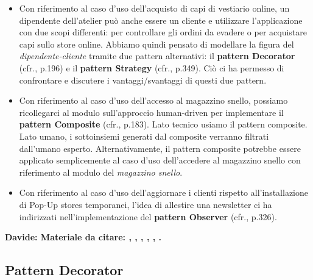 \documentclass[12pt]{article}
\newcommand{\davide}[1]{{\bf \color{chromeyellow} Davide: #1 }}
\begin{document}
\begin{itemize}
    \item Con riferimento al caso d'uso dell'acquisto di capi di vestiario online, un dipendente dell'atelier può anche essere un cliente e utilizzare l'applicazione con due scopi differenti: per controllare gli ordini da evadere o per acquistare capi sullo store online.
    Abbiamo quindi pensato di modellare la figura del {\em dipendente-cliente} tramite due pattern alternativi: il \textbf{pattern Decorator} (cfr.\cite{gof_riferimento}, p.196) e il \textbf{pattern Strategy} (cfr.\cite{gof_riferimento}, p.349). Ciò ci ha permesso di confrontare e discutere i vantaggi/svantaggi di questi due pattern.
    \item Con riferimento al caso d'uso dell'accesso al magazzino snello, possiamo ricollegarci al modulo sull'approccio human-driven per implementare il \textbf{pattern Composite} (cfr.\cite{gof_riferimento}, p.183). Lato tecnico usiamo il pattern composite. Lato umano, i sottoinsiemi generati dal composite verranno filtrati dall'umano esperto.
    Alternativamente, il pattern composite potrebbe essere applicato semplicemente al caso d'uso dell'accedere al magazzino snello con riferimento al modulo del {\em magazzino snello}.
    \item Con riferimento al caso d'uso dell'aggiornare i clienti rispetto all'installazione di Pop-Up stores temporanei, l’idea di allestire una newsletter ci ha indirizzati nell'implementazione del \textbf{pattern Observer} (cfr.\cite{gof_riferimento}, p.326).
\end{itemize}


\davide{Materiale da citare: \cite{gof_riferimento}, \cite{up-riferimento}, \cite{uml_riferimento}, \cite{elicitation_tools}, \cite{gof_sunt}, \cite{github}.}


\subsection{Pattern Decorator}
\end{document}
